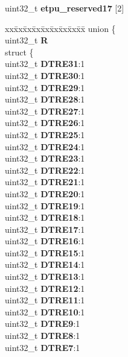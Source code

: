 \begin{DoxyCompactItemize}
\begin{tabbing}
\end{tabbing}\item 
\mbox{\label{structETPU__tag_a129131bd6aae8515e25f7f65a548ab2b}} 
uint32\+\_\+t {\bfseries etpu\+\_\+reserved17} \mbox{[}2\mbox{]}
\item 
\mbox{\label{structETPU__tag_a1b58491ba3dc8433ae2a4dbec7d95a84}} 
\begin{tabbing}
xx\=xx\=xx\=xx\=xx\=xx\=xx\=xx\=xx\=\kill
union \{\\
\>uint32\_t {\bfseries R}\\
\>struct \{\\
\>\>uint32\_t {\bfseries DTRE31}:1\\
\>\>uint32\_t {\bfseries DTRE30}:1\\
\>\>uint32\_t {\bfseries DTRE29}:1\\
\>\>uint32\_t {\bfseries DTRE28}:1\\
\>\>uint32\_t {\bfseries DTRE27}:1\\
\>\>uint32\_t {\bfseries DTRE26}:1\\
\>\>uint32\_t {\bfseries DTRE25}:1\\
\>\>uint32\_t {\bfseries DTRE24}:1\\
\>\>uint32\_t {\bfseries DTRE23}:1\\
\>\>uint32\_t {\bfseries DTRE22}:1\\
\>\>uint32\_t {\bfseries DTRE21}:1\\
\>\>uint32\_t {\bfseries DTRE20}:1\\
\>\>uint32\_t {\bfseries DTRE19}:1\\
\>\>uint32\_t {\bfseries DTRE18}:1\\
\>\>uint32\_t {\bfseries DTRE17}:1\\
\>\>uint32\_t {\bfseries DTRE16}:1\\
\>\>uint32\_t {\bfseries DTRE15}:1\\
\>\>uint32\_t {\bfseries DTRE14}:1\\
\>\>uint32\_t {\bfseries DTRE13}:1\\
\>\>uint32\_t {\bfseries DTRE12}:1\\
\>\>uint32\_t {\bfseries DTRE11}:1\\
\>\>uint32\_t {\bfseries DTRE10}:1\\
\>\>uint32\_t {\bfseries DTRE9}:1\\
\>\>uint32\_t {\bfseries DTRE8}:1\\
\>\>uint32\_t {\bfseries DTRE7}:1\\

\end{tabbing}
\end{DoxyCompactItemize}
